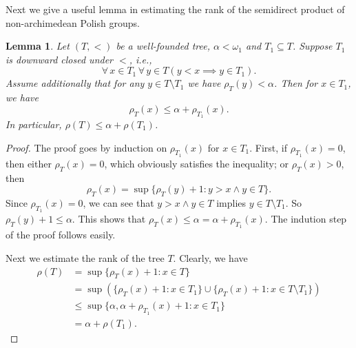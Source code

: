 \documentclass[11pt]{amsart}
\newtheorem{lemma}[theorem]{Lemma}
\theoremstyle{definition}
\theoremstyle{remark}
\numberwithin{equation}{section}
\def\dgnb{{\mathrm{dgnb}}}
\begin{document}

Next we give a useful lemma in estimating the rank of the semidirect product of non-archimedean Polish groups.
\begin{lemma}\label{rank of concatenated trees}
    Let $(T,<)$ be a well-founded tree, $\alpha<\omega_1$ and $T_1\subseteq T$. Suppose $T_1$ is downward closed under $<$, i.e.,
    $$\forall\,x\in T_1\,\forall\,y\in T\left(y<x\implies y\in T_1\right).$$
    Assume additionally that for any $y\in T\setminus T_1$ we have $\rho_T(y)<\alpha$. Then for $x\in T_1$, we have
    $$\rho_T(x)\leq\alpha+\rho_{T_1}(x).$$
    In particular, $\rho(T)\leq\alpha+\rho(T_1)$.
\end{lemma}
\begin{proof}
    The proof goes by induction on $\rho_{T_1}(x)$ for $x\in T_1$. First, if $\rho_{T_1}(x)=0$, then either $\rho_T(x)=0$, which obviously satisfies the inequality; or $\rho_T(x)>0$, then
    $$\rho_T(x)=\sup\{\rho_T(y)+1:y>x\land y\in T\}.$$
    Since $\rho_{T_1}(x)=0$, we can see that $y>x\land y\in T$ implies $y\in T\setminus T_1$. So $\rho_T(y)+1\leq\alpha$. This shows that $\rho_T(x)\leq\alpha=\alpha+\rho_{T_1}(x)$. The indution step of the proof follows easily.

    Next we estimate the rank of the tree $T$. Clearly, we have
    \begin{align*}
        \rho(T)&=\sup\{\rho_T(x)+1:x\in T\}\\
        &=\sup\left(\{\rho_T(x)+1:x\in T_1\}\cup\{\rho_T(x)+1:x\in T\setminus T_1\}\right)\\
        &\leq\sup\{\alpha,\alpha+\rho_{T_1}(x)+1:x\in T_1\}\\
        &=\alpha+\rho(T_1).
    \end{align*}
\end{proof}
\end{document}
